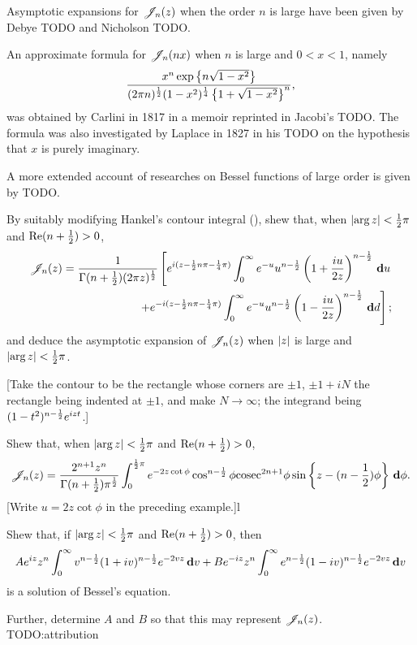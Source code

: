 \documentclass{book}
\begin{document}
Asymptotic expansions for $\mathscr{J}_n(z)$ when the order $n$ is large have
been given by Debye TODO and Nicholson TODO.

An approximate formula for $\mathscr{J}_n(nx)$ when $n$ is large and $0<x<1$,
namely
$$
\frac{ x^n \exp\left\{ n \sqrt{1-x^2} \right\}}{ (2\pi n)^{\frac{1}{2}} (1-x^2)^{\frac{1}{4}} \left\{ 1 +
    \sqrt{1 - x^2} \right\}^n},
$$
was obtained by Carlini in 1817 in a memoir reprinted in Jacobi's
TODO.
The formula was also investigated by Laplace in 1827 in his TODO on
the hypothesis that $x$ is purely imaginary.

A more extended account of researches on Bessel functions of large
order is given by TODO.
\begin{wandwexample}
  By suitably modifying Hankel's contour integral
  (), shew that, when
  $\left| \arg z \right| < \frac{1}{2} \pi$ and
  $\mathrm{Re}(n+\frac{1}{2}) > 0$,
  \begin{align*}
    \mathscr{J}_n(z)
    =
    \frac{1}{\Gamma(n+\frac{1}{2}) (2\pi z)^{\frac{1}{2}}}
    \left[
      e^{i(z - \frac{1}{2} n \pi - \frac{1}{4} \pi)}
      \int_0^{\infty}
      e^{-u}
      u^{n-\frac{1}{2}}
      \left( 1 + \frac{iu}{2z} \right)^{n-\frac{1}{2}}
      \, \mathbf{d} u
    \right.
    \\
    \left.
      +
      e^{-i(z - \frac{1}{2} n \pi - \frac{1}{4}\pi)}
      \int_0^{\infty}
      e^{-u}
      u^{n-\frac{1}{2}}
      \left( 1 - \frac{iu}{2z} \right)^{n-\frac{1}{2}}
      \, \mathbf{d} d
    \right];
  \end{align*}
  and deduce the asymptotic expansion of $\mathscr{J}_n(z)$ when
  $\left| z \right|$ is large and
  $\left| \arg z \right| < \frac{1}{2} \pi$.

  [Take the contour to be the rectangle whose corners are
  $\pm 1$, $\pm 1 + iN$ the rectangle being indented at $\pm 1$,
  and make $N \rightarrow \infty$; the integrand being
  $(1-t^2)^{n-\frac{1}{2}} e^{izt}$.]
\end{wandwexample}
\begin{wandwexample}
  Shew that, when $\left| \arg z \right| < \frac{1}{2} \pi$ and
  $\mathrm{Re}(n+\frac{1}{2}) > 0$,
  $$
  \mathscr{J}_n(z)
  =
  \frac{2^{n+1} z^n}{\Gamma(n+\frac{1}{2}) \pi^{\frac{1}{2}}}
  \int_0^{\frac{1}{2}\pi}
  e^{-2z\cot\phi}
  \cos^{n-\frac{1}{2}}\phi
  \mathrm{cosec}^{2n+1}\phi
  \sin\left\{ z - (n-\frac{1}{2})\phi \right\}
  \, \mathbf{d} \phi.
  $$
  [Write $u = 2z\cot\phi$ in the preceding example.]l
\end{wandwexample}
\begin{wandwexample}
  Shew that, if $\left| \arg z \right| < \frac{1}{2} \pi$ and
  $\mathrm{Re}(n+\frac{1}{2}) > 0$, then
  $$
  A e^{iz} z^n
  \int_0^{\infty}
  v^{n-\frac{1}{2}}
  (1+iv)^{n-\frac{1}{2}}
  e^{-2vz}
  \, \mathbf{d} v
  +
  B e^{-iz} z^n
  \int_0^{\infty}
  e^{n-\frac{1}{2}}
  (1-iv)^{n-\frac{1}{2}}
  e^{-2vz}
  \, \mathbf{d} v
  $$
  is a solution of Bessel's equation.

  Further, determine $A$ and $B$ so that this may represent
  $\mathscr{J}_n(z)$.
  TODO:attribution
\end{wandwexample}
\end{document}
